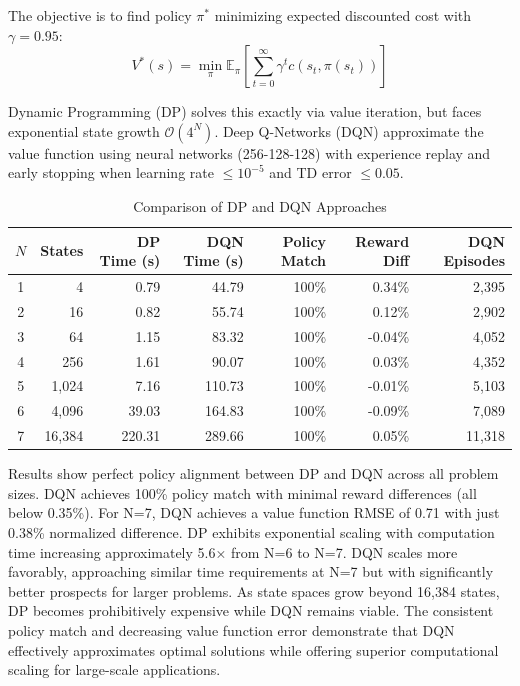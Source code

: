 The objective is to find policy $\pi^*$ minimizing expected discounted cost with $\gamma=0.95$:
\begin{equation}
V^*(s) = \min_{\pi} \mathbb{E}_{\pi} \left[ \sum_{t=0}^{\infty} \gamma^t c(s_t, \pi(s_t)) \right]
\end{equation}

Dynamic Programming (DP) solves this exactly via value iteration, but faces exponential state growth $\mathcal{O}(4^N)$. Deep Q-Networks (DQN) approximate the value function using neural networks (256-128-128) with experience replay and early stopping when learning rate $\leq 10^{-5}$ and TD error $\leq 0.05$.

\begin{table}[h]
\caption{Comparison of DP and DQN Approaches}
\centering
\begin{tabular}{c|rrrrrr}
\hline
$N$ & States & DP Time (s) & DQN Time (s) & Policy Match & Reward Diff & DQN Episodes \\
\hline
1 & 4 & 0.79 & 44.79 & 100\% & 0.34\% & 2,395 \\
2 & 16 & 0.82 & 55.74 & 100\% & 0.12\% & 2,902 \\
3 & 64 & 1.15 & 83.32 & 100\% & -0.04\% & 4,052 \\
4 & 256 & 1.61 & 90.07 & 100\% & 0.03\% & 4,352 \\
5 & 1,024 & 7.16 & 110.73 & 100\% & -0.01\% & 5,103 \\
6 & 4,096 & 39.03 & 164.83 & 100\% & -0.09\% & 7,089 \\
7 & 16,384 & 220.31 & 289.66 & 100\% & 0.05\% & 11,318 \\
\hline
\end{tabular}
\end{table}

Results show perfect policy alignment between DP and DQN across all problem sizes. DQN achieves 100\% policy match with minimal reward differences (all below 0.35\%). For N=7, DQN achieves a value function RMSE of 0.71 with just 0.38\% normalized difference. DP exhibits exponential scaling with computation time increasing approximately 5.6× from N=6 to N=7. DQN scales more favorably, approaching similar time requirements at N=7 but with significantly better prospects for larger problems. As state spaces grow beyond 16,384 states, DP becomes prohibitively expensive while DQN remains viable. The consistent policy match and decreasing value function error demonstrate that DQN effectively approximates optimal solutions while offering superior computational scaling for large-scale applications.

